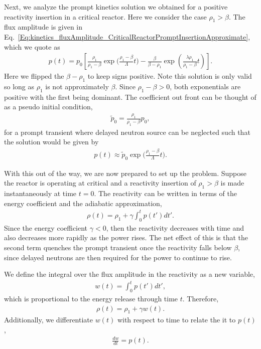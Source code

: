 Next, we analyze the prompt kinetics solution we obtained for a positive reactivity insertion in a critical reactor. Here we consider the case $\rho_1 > \beta$. The flux amplitude is given in Eq.~\eqref{Eq:kinetics_fluxAmplitude_CriticalReactorPromptInsertionApproximate}, which we quote as
\begin{align}
  p(t) = p_0 \left[ \frac{ \rho_1 }{ \rho_1 - \beta } \exp\bigg( \frac{ \rho_1 - \beta }{ \Lambda } t \bigg)  - \frac{ \beta }{ \beta - \rho_1 }  \exp\left(  \frac{ \lambda \rho_1 }{ \rho_1 - \beta } t \right)  \right] .
\end{align}
Here we flipped the $\beta - \rho_1$ to keep signs positive. Note this solution is only valid so long as $\rho_1$ is not approximately $\beta$. Since $\rho_1 - \beta > 0$, both exponentials are positive with the first being dominant. The coefficient out front can be thought of as a pseudo initial condition,
\begin{align}
  \tilde{p}_0 = \frac{ \rho_1 }{ \rho_1 - \beta } p_0,
\end{align}
for a prompt transient where delayed neutron source can be neglected such that the solution would be given by
\begin{align}
  p(t) \approx \tilde{p}_0 \exp\bigg( \frac{ \rho_1 - \beta }{ \Lambda } t \bigg) .
\end{align}

With this out of the way, we are now prepared to set up the problem. Suppose the reactor is operating at critical and a reactivity insertion of $\rho_1 > \beta$ is made instantaneously at time $t = 0$. The reactivity can be written in terms of the energy coefficient and the adiabatic approximation,
\begin{align}
  \rho(t) = \rho_1 + \gamma \int_0^t p(t') dt' .
\end{align}
Since the energy coefficient $\gamma < 0$, then the reactivity decreases with time and also decreases more rapidly as the power rises. The net effect of this is that the second term quenches the prompt transient once the reactivity falls below $\beta$, since delayed neutrons are then required for the power to continue to rise.

We define the integral over the flux amplitude in the reactivity as a new variable,
\begin{align}
  w(t) = \int_0^t p(t') dt' ,
\end{align}
which is proportional to the energy release through time $t$. Therefore,
\begin{align}
  \rho(t) = \rho_1 + \gamma w(t) . \nonumber
\end{align}
Additionally, we differentiate $w(t)$ with respect to time to relate the it to $p(t)$,
\begin{align}
  \frac{dw}{dt} = p(t) .
\end{align}

